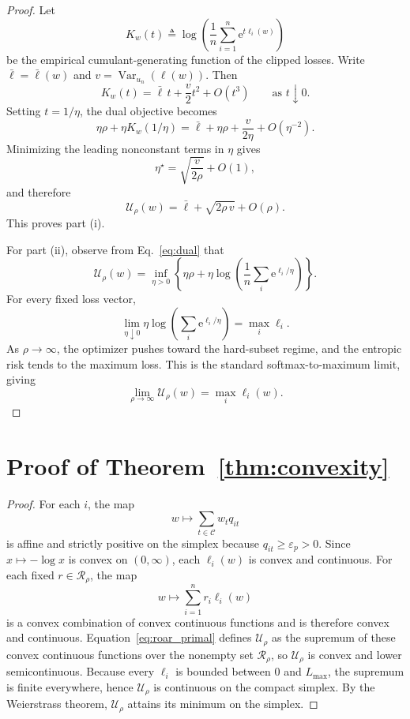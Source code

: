 \documentclass{article}
\newcommand{\cC}{\mathcal{C}}
\newcommand{\cR}{\mathcal{R}}
\newcommand{\e}{\mathrm{e}}
\begin{document}
\begin{proof}
Let
\[
    K_w(t)
    \triangleq
    \log\!\left(\frac{1}{n}\sum_{i=1}^{n}\e^{t\ell_i(w)}\right)
\]
be the empirical cumulant-generating function of the clipped losses. Write $\bar \ell=\bar \ell(w)$ and $v=\operatorname{Var}_{u_n}(\ell(w))$. Then
\[
    K_w(t)= \bar \ell\, t + \frac{v}{2}t^2 + O(t^3)
    \qquad \text{as } t\downarrow 0.
\]
Setting $t=1/\eta$, the dual objective becomes
\[
    \eta\rho + \eta K_w(1/\eta)
    =
    \bar \ell + \eta\rho + \frac{v}{2\eta} + O(\eta^{-2}).
\]
Minimizing the leading nonconstant terms in $\eta$ gives
\[
    \eta^{\star}
    =
    \sqrt{\frac{v}{2\rho}} + O(1),
\]
and therefore
\[
    \mathcal U_{\rho}(w)
    =
    \bar \ell + \sqrt{2\rho\,v} + O(\rho).
\]
This proves part (i).

For part (ii), observe from Eq.~\eqref{eq:dual} that
\[
    \mathcal U_{\rho}(w)
    =
    \inf_{\eta>0}
    \left\{
        \eta\rho
        +
        \eta\log\!\left(\frac{1}{n}\sum_i \e^{\ell_i/\eta}\right)
    \right\}.
\]
For every fixed loss vector,
\[
    \lim_{\eta\downarrow 0}
    \eta\log\!\left(\sum_i \e^{\ell_i/\eta}\right)
    =
    \max_i \ell_i.
\]
As $\rho\to\infty$, the optimizer pushes toward the hard-subset regime, and the entropic risk tends to the maximum loss. This is the standard softmax-to-maximum limit, giving
\[
    \lim_{\rho\to\infty}\mathcal U_{\rho}(w)=\max_i \ell_i(w).
\]
\end{proof}

\section{Proof of Theorem~\ref{thm:convexity}}

\begin{proof}
For each $i$, the map
\[
    w\mapsto \sum_{t\in\cC} w_t q_{it}
\]
is affine and strictly positive on the simplex because $q_{it}\ge \varepsilon_p>0$. Since $x\mapsto -\log x$ is convex on $(0,\infty)$, each $\ell_i(w)$ is convex and continuous. For each fixed $r\in\cR_{\rho}$, the map
\[
    w\mapsto \sum_{i=1}^{n} r_i \ell_i(w)
\]
is a convex combination of convex continuous functions and is therefore convex and continuous. Equation~\eqref{eq:roar_primal} defines $\mathcal U_{\rho}$ as the supremum of these convex continuous functions over the nonempty set $\cR_{\rho}$, so $\mathcal U_{\rho}$ is convex and lower semicontinuous. Because every $\ell_i$ is bounded between $0$ and $L_{\max}$, the supremum is finite everywhere, hence $\mathcal U_{\rho}$ is continuous on the compact simplex. By the Weierstrass theorem, $\mathcal U_{\rho}$ attains its minimum on the simplex.
\end{proof}
\end{document}
